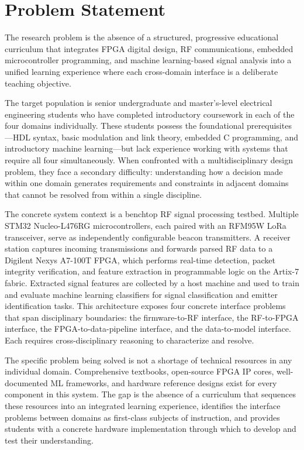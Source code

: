 \documentclass[conference]{IEEEtran}
\begin{document}
\section{Problem Statement}\label{sec:problem}

The research problem is the absence of a structured, progressive educational curriculum that integrates FPGA digital design, RF communications, embedded microcontroller programming, and machine learning-based signal analysis into a unified learning experience where each cross-domain interface is a deliberate teaching objective.

The target population is senior undergraduate and master's-level electrical engineering students who have completed introductory coursework in each of the four domains individually. These students possess the foundational prerequisites---HDL syntax, basic modulation and link theory, embedded C programming, and introductory machine learning---but lack experience working with systems that require all four simultaneously. When confronted with a multidisciplinary design problem, they face a secondary difficulty: understanding how a decision made within one domain generates requirements and constraints in adjacent domains that cannot be resolved from within a single discipline.

The concrete system context is a benchtop RF signal processing testbed. Multiple STM32 Nucleo-L476RG microcontrollers, each paired with an RFM95W LoRa transceiver, serve as independently configurable beacon transmitters. A receiver station captures incoming transmissions and forwards parsed RF data to a Digilent Nexys A7-100T FPGA, which performs real-time detection, packet integrity verification, and feature extraction in programmable logic on the Artix-7 fabric. Extracted signal features are collected by a host machine and used to train and evaluate machine learning classifiers for signal classification and emitter identification tasks. This architecture exposes four concrete interface problems that span disciplinary boundaries: the firmware-to-RF interface, the RF-to-FPGA interface, the FPGA-to-data-pipeline interface, and the data-to-model interface. Each requires cross-disciplinary reasoning to characterize and resolve. %

The specific problem being solved is not a shortage of technical resources in any individual domain. Comprehensive textbooks, open-source FPGA IP cores, well-documented ML frameworks, and hardware reference designs exist for every component in this system. The gap is the absence of a curriculum that sequences these resources into an integrated learning experience, identifies the interface problems between domains as first-class subjects of instruction, and provides students with a concrete hardware implementation through which to develop and test their understanding.
\end{document}
